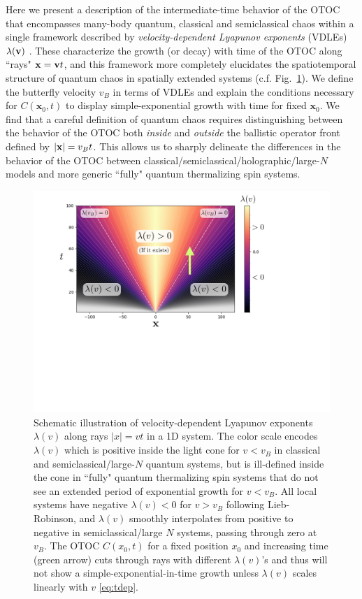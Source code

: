 \documentclass[aps,prl,reprint,superscriptaddress, longbibliography]{revtex4-1}
\newcommand{\vb}{v_B}
\begin{document}
Here we present a description of the intermediate-time behavior of the OTOC that encompasses many-body quantum, classical and semiclassical chaos within a single framework described by \emph{velocity-dependent Lyapunov exponents} (VDLEs) $\lambda({\bf v})$ \cite{Lieb72,Deissler1984,Kaneko1986,DeisslerKaneko}. These characterize the growth (or decay) with time of the OTOC along ``rays" ${\bf x} = {\bf v}t$, and this framework more completely elucidates the spatiotemporal structure of quantum chaos in spatially extended systems (c.f. Fig.~\ref{fig:lamv}). We define the butterfly velocity $v_B$ in terms of VDLEs and explain the conditions necessary for $C(\mathbf{x}_0,t)$ to display simple-exponential growth with time for fixed $\mathbf{x}_0$.  We find that a careful definition of quantum chaos requires distinguishing between the behavior of the OTOC both \emph{inside} and \emph{outside} the ballistic operator front defined by $|{\bf x}| = v_B t$. This allows us to sharply delineate the differences in the behavior of the OTOC between classical/semiclassical/holographic/large-$N$ models and more generic ``fully"  quantum thermalizing spin systems. 

\begin{figure}
  \includegraphics[width=\columnwidth]{lamv.pdf}
  \caption{\label{fig:lamv} Schematic illustration of velocity-dependent Lyapunov exponents $\lambda(v)$ along rays $|x|=vt$ in a 1D system. The color scale encodes $\lambda(v)$ which is positive inside the light cone for $v < \vb$ in classical and semiclassical/large-$N$ quantum systems, but is ill-defined inside the cone in ``fully" quantum thermalizing spin systems that do not see an extended period of exponential growth for $v < \vb$. All local systems have  negative $\lambda(v) <0$ for $v > \vb$ following Lieb-Robinson, and $\lambda(v)$ smoothly interpolates from positive to negative in semiclassical/large $N$ systems, passing through zero at $\vb$. The OTOC $C(x_0,t)$ for a fixed position $x_0$ and increasing time (green arrow) cuts through rays with different $\lambda(v)$'s and thus will not show a simple-exponential-in-time growth unless $\lambda(v)$ scales linearly with $v$ \eqref{eq:tdep}.} 
\end{figure}
\end{document}

